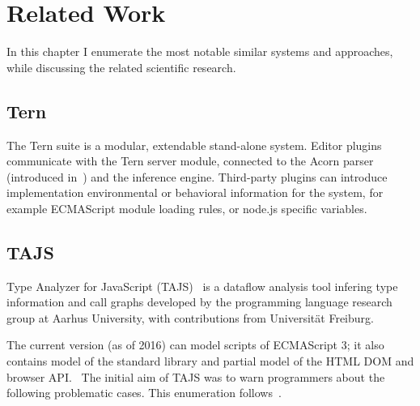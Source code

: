 \chapter{Related Work}
\label{chap:related-work}

In this chapter I enumerate the most notable similar systems and approaches, while discussing the related scientific research.

\section{Tern}
\label{sect:tern}

The Tern suite is a modular, extendable stand-alone system. Editor plugins communicate with the Tern server module, connected to the Acorn parser (introduced in~) and the inference engine. Third-party plugins can introduce implementation environmental or behavioral information for the system, for example ECMAScript module loading rules, or node.js specific variables.~\cite{tern-docs}


\section{TAJS}
Type Analyzer for JavaScript (TAJS)~\cite{tajs} is a dataflow analysis tool infering type information and call graphs developed by the programming language research group at Aarhus University, with contributions from Universität Freiburg.

The current version (as of 2016) can model scripts of ECMAScript 3; it also contains model of the standard library and partial model of the HTML DOM and browser API.~\cite{tajs-git} The initial aim of TAJS was to warn programmers about the following problematic cases. This enumeration follows~\cite{jensen_type_2009}.

